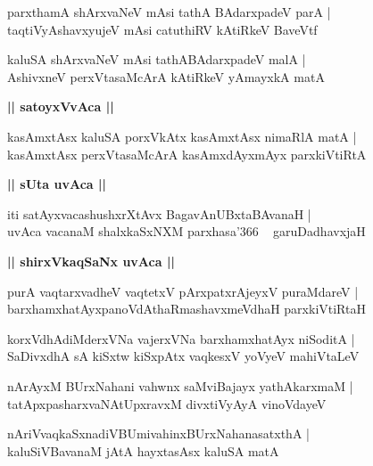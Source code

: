 \documentclass[twoside,12pt,openright]{book}
\newcounter{shloka}[chapter]
\def\uvaca#1{\centerline{{\large\textbf{#1}}}}
\begin{document}
\begin{shloka}%
parxthamA shArxvaNeV mAsi tathA BAdarxpadeV parA |\\
taqtiVyAshavxyujeV mAsi catuthiRV kAtiRkeV BaveVtf
\end{shloka}

\begin{shloka}%
kaluSA shArxvaNeV mAsi tathABAdarxpadeV malA |\\
AshivxneV perxVtasaMcArA kAtiRkeV yAmayxkA matA
\end{shloka}

\uvaca{|| satoyxVvAca ||}

\begin{shloka}%
kasAmxtAsx kaluSA porxVkAtx kasAmxtAsx nimaRlA matA |\\
kasAmxtAsx perxVtasaMcArA kasAmxdAyxmAyx parxkiVtiRtA 
\end{shloka}

\uvaca{|| sUta uvAca ||}

\begin{shloka}%
iti satAyxvacashushxrXtAvx BagavAnUBxtaBAvanaH |\\
uvAca vacanaM shalxkaSxNXM parxhasa\char'366 ~ garuDadhavxjaH 
\end{shloka}

\uvaca{|| shirxVkaqSaNx uvAca ||}

\begin{shloka}%
purA vaqtarxvadheV vaqtetxV pArxpatxrAjeyxV puraMdareV |\\
barxhamxhatAyxpanoVdAthaRmashavxmeVdhaH parxkiVtiRtaH 
\end{shloka}

\begin{shloka}%
korxVdhAdiMderxVNa vajerxVNa barxhamxhatAyx niSoditA |\\
SaDivxdhA sA kiSxtw kiSxpAtx vaqkesxV yoVyeV mahiVtaLeV 
\end{shloka}

\begin{shloka}%
nArAyxM BUrxNahani vahwnx saMviBajayx yathAkarxmaM |\\
tatApxpasharxvaNAtUpxravxM divxtiVyAyA vinoVdayeV 
\end{shloka}

\begin{shloka}%
nAriVvaqkaSxnadiVBUmivahinxBUrxNahanasatxthA |\\
kaluSiVBavanaM jAtA hayxtasAsx kaluSA matA 
\end{shloka}
\end{document}
